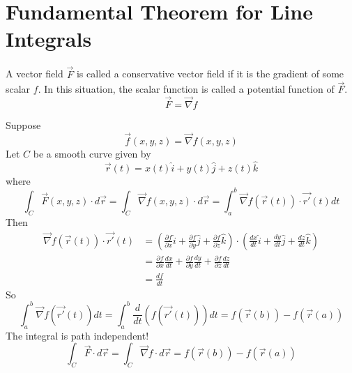 \documentclass[12pt]{article}
\begin{document}
\section{Fundamental Theorem for Line Integrals}

\begin{defn}
	A vector field $\vec{F}$ is called a conservative vector field if it is the gradient of some scalar $f$. In this situation, the scalar function is called a potential function of $\vec{F}$.
	$$\vec{F} = \vec{\nabla}f$$
\end{defn}

Suppose 
$$\vec{f}(x,y,z) = \vec{\nabla}f(x,y,z)$$
Let $C$ be a smooth curve given by
$$\vec{r}(t) = x(t)\hat{i} + y(t)\hat{j} + z(t)\hat{k}$$
where
$$\int_C\vec{F}(x,y,z)\cdot d\vec{r} = \int_C\vec{\nabla}f(x,y,z)\cdot d\vec{r} = \int_a^b \vec{\nabla}f(\vec{r}(t))\cdot\vec{r'}(t)dt$$
Then
\begin{align*}
	\vec{\nabla}f(\vec{r}(t))\cdot \vec{r'}(t) &= \left(\frac{\partial f}{\partial x}\hat{i} + \frac{\partial f}{\partial y}\hat{j} + \frac{\partial f}{\partial z}\hat{k}\right) \cdot \left(\frac{dx}{dt}\hat{i} + \frac{dy}{dt}\hat{j} + \frac{dz}{dt}\hat{k}\right) \\
						   &= \frac{\partial f}{\partial x}\frac{dx}{dt} + \frac{\partial f}{\partial y}\frac{dy}{dt} + \frac{\partial f}{\partial z}\frac{dz}{dt} \\
						   &= \frac{df}{dt}
\end{align*}
So
$$\int_a^b\vec{\nabla}f(\vec{r'}(t))dt = \int_a^b\frac{d}{dt}(f(\vec{r'}(t)))dt = f(\vec{r}(b))-f(\vec{r}(a))$$
The integral is path independent!
$$\int_C\vec{F}\cdot d\vec{r} = \int_C\vec{\nabla}f\cdot d\vec{r} = f(\vec{r}(b))-f(\vec{r}(a))$$
\end{document}
